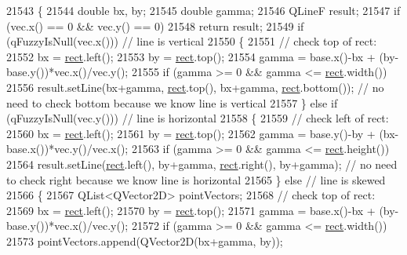 \begin{DoxyCode}
21543 \{
21544   \textcolor{keywordtype}{double} bx, by;
21545   \textcolor{keywordtype}{double} gamma;
21546   QLineF result;
21547   \textcolor{keywordflow}{if} (vec.x() == 0 && vec.y() == 0)
21548     \textcolor{keywordflow}{return} result;
21549   \textcolor{keywordflow}{if} (qFuzzyIsNull(vec.x())) \textcolor{comment}{// line is vertical}
21550   \{
21551     \textcolor{comment}{// check top of rect:}
21552     bx = \hyperlink{_gen_blob_8m_aea8f6815d9a63491fc422c5572c6b3c3}{rect}.left();
21553     by = \hyperlink{_gen_blob_8m_aea8f6815d9a63491fc422c5572c6b3c3}{rect}.top();
21554     gamma = base.x()-bx + (by-base.y())*vec.x()/vec.y();
21555     \textcolor{keywordflow}{if} (gamma >= 0 && gamma <= \hyperlink{_gen_blob_8m_aea8f6815d9a63491fc422c5572c6b3c3}{rect}.width())
21556       result.setLine(bx+gamma, \hyperlink{_gen_blob_8m_aea8f6815d9a63491fc422c5572c6b3c3}{rect}.top(), bx+gamma, \hyperlink{_gen_blob_8m_aea8f6815d9a63491fc422c5572c6b3c3}{rect}.bottom()); \textcolor{comment}{// no need to check bottom
       because we know line is vertical}
21557   \} \textcolor{keywordflow}{else} \textcolor{keywordflow}{if} (qFuzzyIsNull(vec.y())) \textcolor{comment}{// line is horizontal}
21558   \{
21559     \textcolor{comment}{// check left of rect:}
21560     bx = \hyperlink{_gen_blob_8m_aea8f6815d9a63491fc422c5572c6b3c3}{rect}.left();
21561     by = \hyperlink{_gen_blob_8m_aea8f6815d9a63491fc422c5572c6b3c3}{rect}.top();
21562     gamma = base.y()-by + (bx-base.x())*vec.y()/vec.x();
21563     \textcolor{keywordflow}{if} (gamma >= 0 && gamma <= \hyperlink{_gen_blob_8m_aea8f6815d9a63491fc422c5572c6b3c3}{rect}.height())
21564       result.setLine(\hyperlink{_gen_blob_8m_aea8f6815d9a63491fc422c5572c6b3c3}{rect}.left(), by+gamma, \hyperlink{_gen_blob_8m_aea8f6815d9a63491fc422c5572c6b3c3}{rect}.right(), by+gamma); \textcolor{comment}{// no need to check right
       because we know line is horizontal}
21565   \} \textcolor{keywordflow}{else} \textcolor{comment}{// line is skewed}
21566   \{
21567     QList<QVector2D> pointVectors;
21568     \textcolor{comment}{// check top of rect:}
21569     bx = \hyperlink{_gen_blob_8m_aea8f6815d9a63491fc422c5572c6b3c3}{rect}.left();
21570     by = \hyperlink{_gen_blob_8m_aea8f6815d9a63491fc422c5572c6b3c3}{rect}.top();
21571     gamma = base.x()-bx + (by-base.y())*vec.x()/vec.y();
21572     \textcolor{keywordflow}{if} (gamma >= 0 && gamma <= \hyperlink{_gen_blob_8m_aea8f6815d9a63491fc422c5572c6b3c3}{rect}.width())
21573       pointVectors.append(QVector2D(bx+gamma, by));

\end{DoxyCode}
